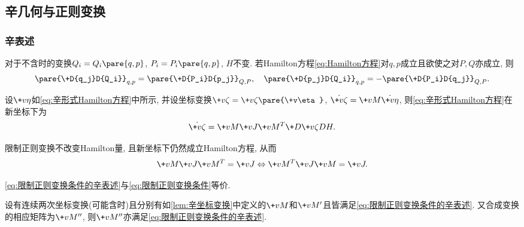 \documentclass[../TheoreticalMechanics.tex]{subfiles}
\begin{document}


\subsection{辛几何与正则变换} %
\label{sub:辛几何与正则变换}

\subsubsection{辛表述} %
\label{ssub:辛表述}

\begin{finale}
    \begin{theorem}[限制正则变换条件]
        对于不含时的变换$Q_i=Q_i\pare{q,p}$, $P_i=P_i\pare{q,p}$, $H$不变. 若Hamilton方程\eqref{eq:Hamilton方程}对$q,p$成立且欲使之对$P,Q$亦成立, 则
        \begin{equation}
            \label{eq:限制正则变换条件}
            \pare{\+D{q_j}D{Q_i}}_{q,p} = \pare{\+D{P_i}D{p_j}}_{Q,P},\quad \pare{\+D{p_j}D{Q_i}}_{q,p} = -\pare{\+D{P_i}D{q_j}}_{Q,P}. 
        \end{equation}
    \end{theorem}
\end{finale}
\begin{lemma}[辛坐标变换]
    \label{lem:辛坐标变换}
    设$\+v\eta$如\eqref{eq:辛形式Hamilton方程}中所示, 并设坐标变换$\+v\zeta = \+v\zeta\pare{\+v\eta}$, $\dot{\+v\zeta}=\+vM\dot{\+v\eta}$, 则\eqref{eq:辛形式Hamilton方程}在新坐标下为
    \begin{equation}
        \label{eq:辛坐标变换}
        \dot{\+v\zeta} = \+vM\+vJ\+vM^T\+D{\+v\zeta}DH.  
    \end{equation}
\end{lemma}
\begin{lemma}[限制正则变换条件的辛表述]
    限制正则变换不改变Hamilton量, 且新坐标下仍然成立Hamilton方程, 从而
    \begin{equation}
        \label{eq:限制正则变换条件的辛表述}
        \+vM\+vJ\+vM^T = \+vJ\Leftrightarrow \+vM^T\+vJ\+vM = \+vJ.
    \end{equation}
\end{lemma}
\begin{remark}
    \eqref{eq:限制正则变换条件的辛表述}与\eqref{eq:限制正则变换条件}等价.
\end{remark}
\begin{lemma}[正则变换作为群]
    \label{lem:正则变换作为群}
    设有连续两次坐标变换(可能含时)且分别有如\cref{lem:辛坐标变换}中定义的$\+vM$和$\+vM'$且皆满足\eqref{eq:限制正则变换条件的辛表述}. 又合成变换的相应矩阵为$\+vM''$, 则$\+vM''$亦满足\eqref{eq:限制正则变换条件的辛表述}.
\end{lemma}
\end{document}
